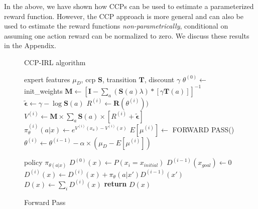\documentclass{article}
\begin{document}
In the above, we have shown how CCPs can be used to estimate a parameterized reward function. However, the CCP approach is more general and can also be used to estimate the reward functions \textit{non-parametrically}, conditional on assuming one action reward can be normalized to zero. We discuss these results in the Appendix.

\begin{figure}[ht]
\begin{minipage}[t]{0.45\textwidth}
  \begin{algorithm}[H]
    \caption{CCP-IRL algorithm} \label{algo:ccp_irl_algorithm}
    \begin{algorithmic}[1]
         expert features $\mu_D$, ccp $\mathbf{S}$, transition $\mathbf{T}$, discount $\gamma$
        \STATE $\theta^{(0)} \gets$ init\_weights
        \STATE $\mathbf{M} \gets \left[\mathbf{I}-\sum_{a}(\mathbf{S}(a) \lambda) *\left[ \gamma \mathbf{T}(a)  \right]\right]^{-1}$ 
        \STATE $\tilde{\bm{\epsilon}} \gets \gamma - \log \mathbf{S}(a)$
            \STATE $R^{(i)} \gets \mathbf{R}(\theta^{(i)}))$
            \STATE $V^{(i)} \gets \mathbf{M} \times \sum_{a}{\mathbf{S}(a) \times \left[ R^{(i)} +\tilde{\bm{\epsilon}}\right]}$
            \STATE $\pi_{\theta}^{(i)}(a|x) \gets e^{V^{(i)}(x_a) - V^{(i)}(x)}$
            \STATE $E[\mu^{(i)}] \gets $ FORWARD PASS()
            \STATE $\theta^{(i)} \gets \theta^{(i-1)} - \alpha \times (\mu_D - E[\mu^{(i)}])$
        \ENDFOR
    \end{algorithmic}
  \end{algorithm}
\end{minipage}%
\qquad
\begin{minipage}[t]{0.45\textwidth}
  \begin{algorithm}[H]
    \caption{Forward Pass} \label{algo:forward_pass_algorithm}
    \begin{algorithmic}[1]
         policy $\pi_{\theta(a|x)}$
        \STATE $D^{(0)}(x) \gets P(x_i = x_{initial})$
            \STATE $D^{(i-1)}(x_{goal}) \gets 0$
            \STATE $D^{(i)}(x) \gets D^{(i)}(x) + \pi_{\theta}(a|x') D^{(i-1)}(x')$
        \ENDFOR
        \STATE $D(x) \gets \sum_{i}D^{(i)}(x)$ 
        \STATE \textbf{return} $D(x)$
    \end{algorithmic}
  \end{algorithm}
\end{minipage}
\end{figure}
\end{document}
